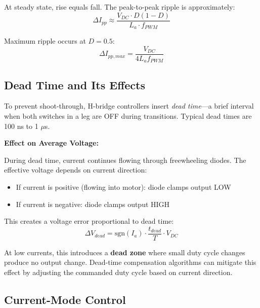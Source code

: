 At steady state, rise equals fall. The peak-to-peak ripple is approximately:
\begin{equation}
    \boxed{\Delta I_{pp} \approx \frac{V_{DC} \cdot D(1-D)}{L_a \cdot f_{PWM}}}
    \label{eq:current_ripple}
\end{equation}

Maximum ripple occurs at $D = 0.5$:
\begin{equation}
    \Delta I_{pp,max} = \frac{V_{DC}}{4 L_a f_{PWM}}
\end{equation}


\subsection{Dead Time and Its Effects}

To prevent shoot-through, H-bridge controllers insert \textit{dead time}---a brief interval when both switches in a leg are OFF during transitions. Typical dead times are 100 ns to 1 $\mu$s.

\textbf{Effect on Average Voltage:}

During dead time, current continues flowing through freewheeling diodes. The effective voltage depends on current direction:
\begin{itemize}
    \item If current is positive (flowing into motor): diode clamps output LOW
    \item If current is negative: diode clamps output HIGH
\end{itemize}

This creates a voltage error proportional to dead time:
\begin{equation}
    \Delta V_{dead} = \text{sgn}(I_a) \cdot \frac{t_{dead}}{T} \cdot V_{DC}
\end{equation}

At low currents, this introduces a \textbf{dead zone} where small duty cycle changes produce no output change. Dead-time compensation algorithms can mitigate this effect by adjusting the commanded duty cycle based on current direction.

\subsection{Current-Mode Control}

